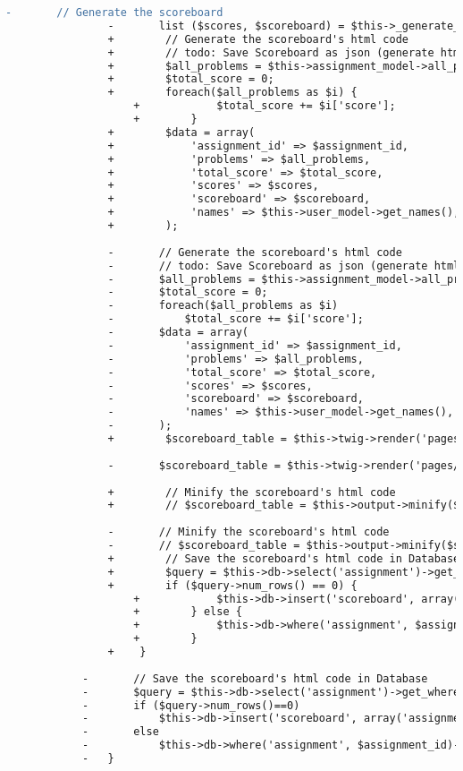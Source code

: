 \begin{lstlisting}[language=diff, caption=Perubahan pada kode Scoreboard\_model.php]
				-		// Generate the scoreboard
				-		list ($scores, $scoreboard) = $this->_generate_scoreboard($assignment_id);
				+        // Generate the scoreboard's html code
				+        // todo: Save Scoreboard as json (generate html at client side)
				+        $all_problems = $this->assignment_model->all_problems($assignment_id);
				+        $total_score = 0;
				+        foreach($all_problems as $i) {
					+            $total_score += $i['score'];
					+        }
				+        $data = array(
				+            'assignment_id' => $assignment_id,
				+            'problems' => $all_problems,
				+            'total_score' => $total_score,
				+            'scores' => $scores,
				+            'scoreboard' => $scoreboard,
				+            'names' => $this->user_model->get_names(),
				+        );
				
				-		// Generate the scoreboard's html code
				-		// todo: Save Scoreboard as json (generate html at client side)
				-		$all_problems = $this->assignment_model->all_problems($assignment_id);
				-		$total_score = 0;
				-		foreach($all_problems as $i)
				-			$total_score += $i['score'];
				-		$data = array(
				-			'assignment_id' => $assignment_id,
				-			'problems' => $all_problems,
				-			'total_score' => $total_score,
				-			'scores' => $scores,
				-			'scoreboard' => $scoreboard,
				-			'names' => $this->user_model->get_names(),
				-		);
				+        $scoreboard_table = $this->twig->render('pages/scoreboard_table.twig', $data);
				
				-		$scoreboard_table = $this->twig->render('pages/scoreboard_table.twig', $data);
				
				+        // Minify the scoreboard's html code
				+        // $scoreboard_table = $this->output->minify($scoreboard_table, 'text/html');
				
				-		// Minify the scoreboard's html code
				-		// $scoreboard_table = $this->output->minify($scoreboard_table, 'text/html');
				+        // Save the scoreboard's html code in Database
				+        $query = $this->db->select('assignment')->get_where('scoreboard', array('assignment' => $assignment_id));
				+        if ($query->num_rows() == 0) {
					+            $this->db->insert('scoreboard', array('assignment' => $assignment_id, 'scoreboard' => $scoreboard_table));
					+        } else {
					+            $this->db->where('assignment', $assignment_id)->update('scoreboard', array('scoreboard' => $scoreboard_table));
					+        }
				+    }
			
			-		// Save the scoreboard's html code in Database
			-		$query = $this->db->select('assignment')->get_where('scoreboard', array('assignment'=>$assignment_id));
			-		if ($query->num_rows()==0)
			-			$this->db->insert('scoreboard', array('assignment'=>$assignment_id, 'scoreboard'=>$scoreboard_table));
			-		else
			-			$this->db->where('assignment', $assignment_id)->update('scoreboard', array('scoreboard'=>$scoreboard_table));
			-	}
		

\end{lstlisting}

